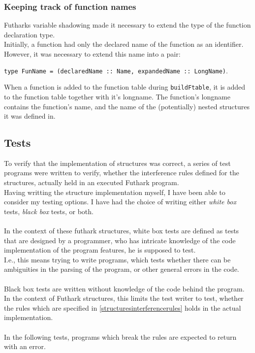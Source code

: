 \subsubsection{Keeping track of function names}
Futharks variable shadowing made it necessary to extend the type of the function
declaration type. \\
Initially, a function had only the declared name of the function as an identifier.
However, it was necessary to extend this name into a pair:

\texttt{type FunName = (declaredName :: Name, expandedName :: LongName)}.

When a function is added to the function table during \texttt{buildFtable}, it
is added to the function table together with it's longname. The function's
longname contains the function's name, and the name of the (potentially) nested
structures it was defined in.

\subsection{Tests\label{subsec:structuretests}}
To verify that the implementation of structures was correct, a series of test
programs were written to verify, whether the interference rules defined for the
structures, actually held in an executed Futhark program.
\\
Having writting the structure implementation myself, I have been able to
consider my testing options. I have had the choice of writing either \textit{white box}
tests, \textit{black box }tests, or both.
\\
\\
In the context of these futhark structures, white box tests are defined as tests
that are designed by a programmer, who has intricate knowledge of the
code implementation of the program features, he is supposed to test.\\
I.e., this means trying to write programs, which tests whether there can be
ambiguities in the parsing of the program, or other general errors in the code.
\\
\\
Black box tests are written without knowledge of the code behind the program.
In the context of Futhark structures, this limits the test writer to test,
whether the rules which are specified in \ref{structuresinterferencerules} holds
in the actual implementation.
\\\\
In the following tests, programs which break the rules are expected to return
with an error.
